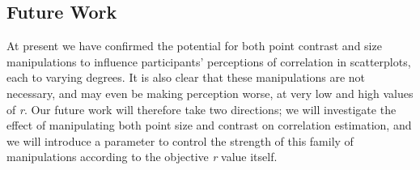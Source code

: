 \documentclass{vgtc}                          %
\begin{document}
\hypertarget{future-work}{%
\subsection{Future Work}\label{future-work}}

At present we have confirmed the potential for both point contrast and size
manipulations to influence participants' perceptions of correlation in scatterplots,
each to varying degrees. It is also clear that these manipulations are not necessary,
and may even be making perception worse, at very low and high values of \emph{r}. Our
future work will therefore take two directions; we will investigate the effect of manipulating
both point size and contrast on correlation estimation, and we will introduce a
parameter to control the strength of this family of manipulations according to the
objective \emph{r} value itself.


%

%
%
%


\end{document}
